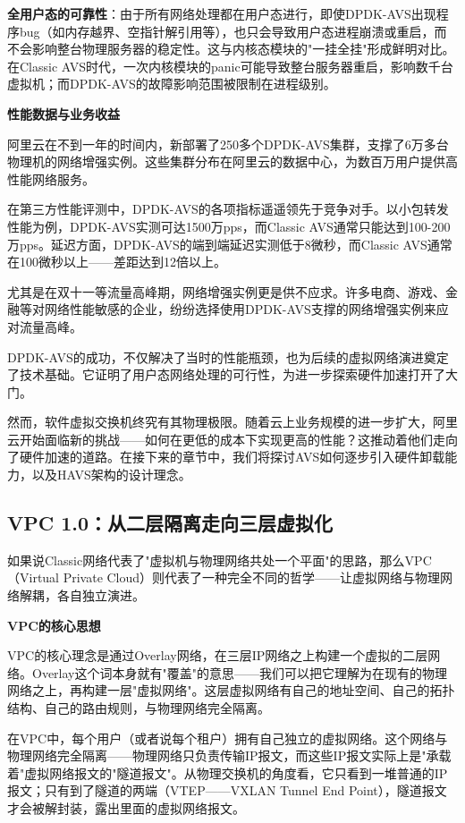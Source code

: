 \textbf{全用户态的可靠性}：由于所有网络处理都在用户态进行，即使DPDK-AVS出现程序bug（如内存越界、空指针解引用等），也只会导致用户态进程崩溃或重启，而不会影响整台物理服务器的稳定性。这与内核态模块的"一挂全挂"形成鲜明对比。在Classic AVS时代，一次内核模块的panic可能导致整台服务器重启，影响数千台虚拟机；而DPDK-AVS的故障影响范围被限制在进程级别。

\textbf{性能数据与业务收益}

阿里云在不到一年的时间内，新部署了250多个DPDK-AVS集群，支撑了6万多台物理机的网络增强实例。这些集群分布在阿里云的数据中心，为数百万用户提供高性能网络服务。

在第三方性能评测中，DPDK-AVS的各项指标遥遥领先于竞争对手。以小包转发性能为例，DPDK-AVS实测可达1500万pps，而Classic AVS通常只能达到100-200万pps。延迟方面，DPDK-AVS的端到端延迟实测低于8微秒，而Classic AVS通常在100微秒以上——差距达到12倍以上。

尤其是在双十一等流量高峰期，网络增强实例更是供不应求。许多电商、游戏、金融等对网络性能敏感的企业，纷纷选择使用DPDK-AVS支撑的网络增强实例来应对流量高峰。

DPDK-AVS的成功，不仅解决了当时的性能瓶颈，也为后续的虚拟网络演进奠定了技术基础。它证明了用户态网络处理的可行性，为进一步探索硬件加速打开了大门。

然而，软件虚拟交换机终究有其物理极限。随着云上业务规模的进一步扩大，阿里云开始面临新的挑战——如何在更低的成本下实现更高的性能？这推动着他们走向了硬件加速的道路。在接下来的章节中，我们将探讨AVS如何逐步引入硬件卸载能力，以及HAVS架构的设计理念。

\subsection{VPC 1.0：从二层隔离走向三层虚拟化}

如果说Classic网络代表了"虚拟机与物理网络共处一个平面"的思路，那么VPC（Virtual Private Cloud）则代表了一种完全不同的哲学——让虚拟网络与物理网络解耦，各自独立演进。

\textbf{VPC的核心思想}

VPC的核心理念是通过Overlay网络，在三层IP网络之上构建一个虚拟的二层网络。Overlay这个词本身就有"覆盖"的意思——我们可以把它理解为在现有的物理网络之上，再构建一层"虚拟网络"。这层虚拟网络有自己的地址空间、自己的拓扑结构、自己的路由规则，与物理网络完全隔离。

在VPC中，每个用户（或者说每个租户）拥有自己独立的虚拟网络。这个网络与物理网络完全隔离——物理网络只负责传输IP报文，而这些IP报文实际上是"承载着"虚拟网络报文的"隧道报文"。从物理交换机的角度看，它只看到一堆普通的IP报文；只有到了隧道的两端（VTEP——VXLAN Tunnel End Point），隧道报文才会被解封装，露出里面的虚拟网络报文。


